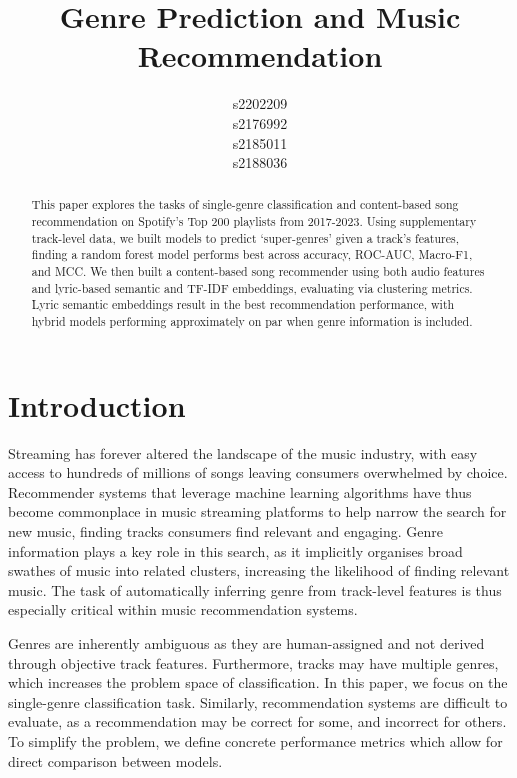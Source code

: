 \documentclass{article}
\title{Genre Prediction and Music Recommendation}
\author{
  s2202209\\
  \And
  s2176992\\
 \And
  s2185011\\
  \And
  s2188036
}
\begin{document}
\maketitle

\begin{abstract}
This paper explores the tasks of single-genre classification and content-based song recommendation on Spotify's Top 200 playlists from 2017-2023. Using supplementary track-level data, we built models to predict `super-genres' given a track's features, finding a random forest model performs best across accuracy, ROC-AUC, Macro-F1, and MCC. We then built a content-based song recommender using both audio features and lyric-based semantic and TF-IDF embeddings, evaluating via clustering metrics. Lyric semantic embeddings result in the best recommendation performance, with hybrid models performing approximately on par when genre information is included.

\end{abstract}




\section{Introduction}
\vspace{-3mm}
Streaming has forever altered the landscape of the music industry, with easy access to hundreds of millions of songs leaving consumers overwhelmed by choice. Recommender systems that leverage machine learning algorithms have thus become commonplace in music streaming platforms to help narrow the search for new music, finding tracks consumers find relevant and engaging. Genre information plays a key role in this search, as it implicitly organises broad swathes of music into related clusters, increasing the likelihood of finding relevant music.  The task of automatically inferring genre from track-level features is thus especially critical within music recommendation systems. 

Genres are inherently ambiguous as they are human-assigned and not derived through objective track features. Furthermore, tracks may have multiple genres, which increases the problem space of classification. In this paper, we focus on the single-genre classification task. Similarly, recommendation systems are difficult to evaluate, as a recommendation may be correct for some, and incorrect for others. To simplify the problem, we define concrete performance metrics which allow for direct comparison between models.
\end{document}

